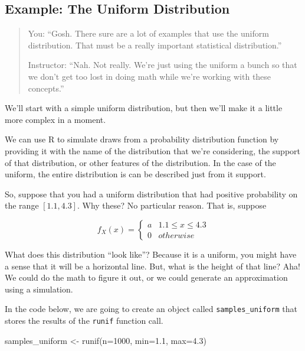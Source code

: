 \documentclass[
  letterpaper,
  DIV=11,
  numbers=noendperiod]{scrreprt}
\newenvironment{Shaded}{\begin{snugshade}}{\end{snugshade}}
\newcommand{\AttributeTok}[1]{\textcolor[rgb]{0.40,0.45,0.13}{#1}}
\newcommand{\DecValTok}[1]{\textcolor[rgb]{0.68,0.00,0.00}{#1}}
\newcommand{\FloatTok}[1]{\textcolor[rgb]{0.68,0.00,0.00}{#1}}
\newcommand{\FunctionTok}[1]{\textcolor[rgb]{0.28,0.35,0.67}{#1}}
\newcommand{\NormalTok}[1]{\textcolor[rgb]{0.00,0.23,0.31}{#1}}
\newcommand{\OtherTok}[1]{\textcolor[rgb]{0.00,0.23,0.31}{#1}}
\begin{document}
\subsection{Example: The Uniform
Distribution}\label{example-the-uniform-distribution}

\begin{quote}
You: ``Gosh. There sure are a lot of examples that use the uniform
distribution. That must be a really important statistical
distribution.''

Instructor: ``Nah. Not really. We're just using the uniform a bunch so
that we don't get too lost in doing math while we're working with these
concepts.''
\end{quote}

We'll start with a simple uniform distribution, but then we'll make it a
little more complex in a moment.

We can use R to simulate draws from a probability distribution function
by providing it with the name of the distribution that we're
considering, the support of that distribution, or other features of the
distribution. In the case of the uniform, the entire distribution is can
be described just from it support.

So, suppose that you had a uniform distribution that had positive
probability on the range \([1.1, 4.3]\). Why these? No particular
reason. That is, suppose

\[
f_{X}(x) =
  \begin{cases} 
    a & 1.1 \leq x \leq 4.3 \\ 
    0 & otherwise
  \end{cases}
\]

What does this distribution ``look like''? Because it is a uniform, you
might have a sense that it will be a horizontal line. But, what is the
height of that line? Aha! We could do the math to figure it out, or we
could generate an approximation using a simulation.

In the code below, we are going to create an object called
\texttt{samples\_uniform} that stores the results of the \texttt{runif}
function call.

\begin{Shaded}
\begin{Highlighting}[]
\NormalTok{samples\_uniform }\OtherTok{\textless{}{-}} \FunctionTok{runif}\NormalTok{(}\AttributeTok{n=}\DecValTok{1000}\NormalTok{, }\AttributeTok{min=}\FloatTok{1.1}\NormalTok{, }\AttributeTok{max=}\FloatTok{4.3}\NormalTok{)}
\end{Highlighting}
\end{Shaded}
\end{document}
